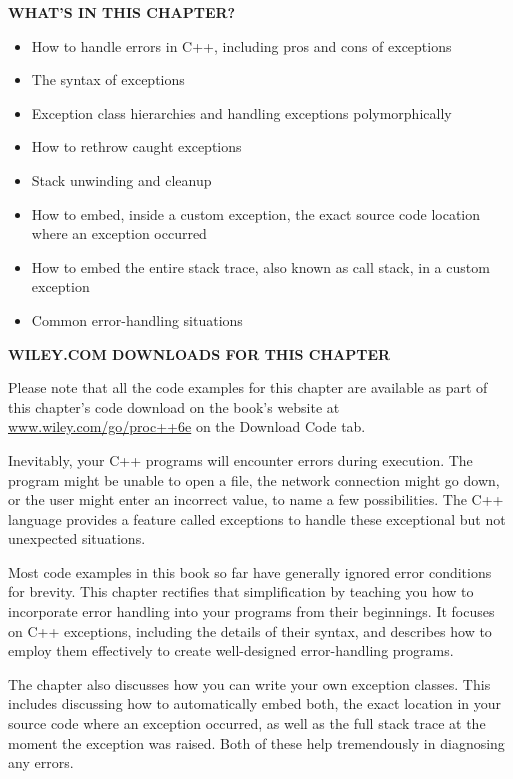 \noindent
\textbf{WHAT’S IN THIS CHAPTER?}

\begin{itemize}
\item
How to handle errors in C++, including pros and cons of exceptions

\item
The syntax of exceptions

\item
Exception class hierarchies and handling exceptions polymorphically

\item
How to rethrow caught exceptions

\item
Stack unwinding and cleanup

\item
How to embed, inside a custom exception, the exact source code location where an exception occurred

\item
How to embed the entire stack trace, also known as call stack, in a custom exception

\item
Common error-handling situations
\end{itemize}

\noindent
\textbf{WILEY.COM DOWNLOADS FOR THIS CHAPTER}

Please note that all the code examples for this chapter are available as part of this chapter’s code download on the book’s website at \url{www.wiley.com/go/proc++6e} on the Download Code tab.

Inevitably, your C++ programs will encounter errors during execution. The program might be unable to open a file, the network connection might go down, or the user might enter an incorrect value, to name a few possibilities. The C++ language provides a feature called exceptions to handle these exceptional but not unexpected situations.

Most code examples in this book so far have generally ignored error conditions for brevity. This chapter rectifies that simplification by teaching you how to incorporate error handling into your programs from their beginnings. It focuses on C++ exceptions, including the details of their syntax, and describes how to employ them effectively to create well-designed error-handling programs.

The chapter also discusses how you can write your own exception classes. This includes discussing how to automatically embed both, the exact location in your source code where an exception occurred, as well as the full stack trace at the moment the exception was raised. Both of these help tremendously in diagnosing any errors.











